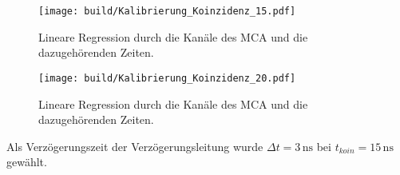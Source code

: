 \begin{figure}[H]
    \centering
    \texttt{[image: build/Kalibrierung\_Koinzidenz\_15.pdf]}
    \caption{Lineare Regression durch die Kanäle des MCA und die dazugehörenden Zeiten.}
    \label{fig:koin_15}
\end{figure}

\begin{figure}[H]
    \centering
    \texttt{[image: build/Kalibrierung\_Koinzidenz\_20.pdf]}
    \caption{Lineare Regression durch die Kanäle des MCA und die dazugehörenden Zeiten.}
    \label{fig:koin_20}
\end{figure}

Als Verzögerungszeit der Verzögerungsleitung wurde $\Delta t = 3 \,\unit{\nano\second}$ bei $t_{koin} = 15 \, \unit{\nano\second}$ gewählt.

